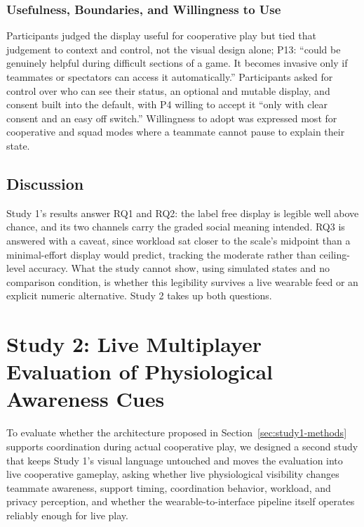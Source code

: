 \documentclass[manuscript,review,anonymous]{acmart}
\begin{document}
\subsubsection{Usefulness, Boundaries, and Willingness to Use}
Participants judged the display useful for cooperative play but tied that judgement to context and control, not the visual design alone; P13: ``could be genuinely helpful during difficult sections of a game. It becomes invasive only if teammates or spectators can access it automatically.'' Participants asked for control over who can see their status, an optional and mutable display, and consent built into the default, with P4 willing to accept it ``only with clear consent and an easy off switch.'' Willingness to adopt was expressed most for cooperative and squad modes where a teammate cannot pause to explain their state.

\subsection{Discussion}
Study 1's results answer RQ1 and RQ2: the label free display is legible well above chance, and its two channels carry the graded social meaning intended. RQ3 is answered with a caveat, since workload sat closer to the scale's midpoint than a minimal-effort display would predict, tracking the moderate rather than ceiling-level accuracy. What the study cannot show, using simulated states and no comparison condition, is whether this legibility survives a live wearable feed or an explicit numeric alternative. Study 2 takes up both questions.

\section{Study 2: Live Multiplayer Evaluation of Physiological Awareness Cues}
\label{sec:study2-methods}
\noindent
To evaluate whether the architecture proposed in Section~\ref{sec:study1-methods} supports coordination during actual cooperative play, we designed a second study that keeps Study 1's visual language untouched and moves the evaluation into live cooperative gameplay, asking whether live physiological visibility changes teammate awareness, support timing, coordination behavior, workload, and privacy perception, and whether the wearable-to-interface pipeline itself operates reliably enough for live play.
\end{document}
